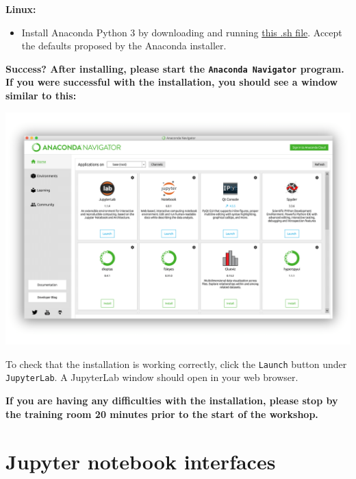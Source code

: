 \documentclass[
]{book}
\providecommand{\tightlist}{%
  \setlength{\itemsep}{0pt}\setlength{\parskip}{0pt}}
\begin{document}
\textbf{Linux:}

\begin{itemize}
\tightlist
\item
  Install Anaconda Python 3 by downloading and running \href{https://repo.anaconda.com/archive/Anaconda3-2019.10-Linux-x86_64.sh}{this .sh file}. Accept the defaults proposed by the Anaconda installer.
\end{itemize}

\begin{alert}

\textbf{Success? After installing, please start the \texttt{Anaconda\ Navigator} program. If you were successful with the installation, you should see a window similar to this:}

\end{alert}

\includegraphics{Python/PythonInstall/images/Anaconda_navigator.png}

To check that the installation is working correctly, click the \texttt{Launch} button under \texttt{JupyterLab}. A JupyterLab window should open in your web browser.

\begin{alert}

\textbf{If you are having any difficulties with the installation, please stop by the training room 20 minutes prior to the start of the workshop.}

\end{alert}

\hypertarget{jupyter-notebook-interfaces}{%
\section{Jupyter notebook interfaces}\label{jupyter-notebook-interfaces}}
\end{document}
